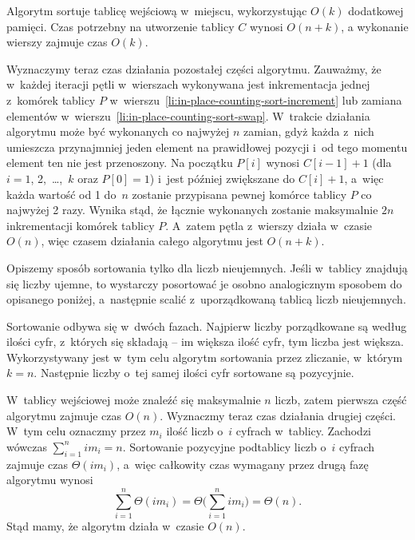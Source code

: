 Algorytm sortuje tablicę wejściową w~miejscu, wykorzystując $O(k)$ dodatkowej pamięci. Czas potrzebny na utworzenie tablicy $C$ wynosi $O(n+k)$, a wykonanie wierszy \twodashes{\ref{li:in-place-counting-sort-preprocessing-begin}}{\ref{li:in-place-counting-sort-preprocessing-end}} zajmuje czas $O(k)$.

Wyznaczymy teraz czas działania pozostałej części algorytmu. Zauważmy, że w~każdej iteracji pętli  w~wierszach \twodashes{\ref{li:in-place-counting-sort-while-begin}}{\ref{li:in-place-counting-sort-while-end}} wykonywana jest inkrementacja jednej z~komórek tablicy $P$ w~wierszu~\ref{li:in-place-counting-sort-increment} lub zamiana elementów w~wierszu~\ref{li:in-place-counting-sort-swap}. W~trakcie działania algorytmu może być wykonanych co najwyżej $n$ zamian, gdyż każda z~nich umieszcza przynajmniej jeden element na prawidłowej pozycji i~od tego momentu element ten nie jest przenoszony. Na początku $P[i]$ wynosi $C[i-1]+1$ (dla $i=1$, 2,~\dots,~$k$ oraz $P[0]=1$) i~jest później zwiększane do $C[i]+1$, a~więc każda wartość od 1 do~$n$ zostanie przypisana pewnej komórce tablicy $P$ co najwyżej 2 razy. Wynika stąd, że łącznie wykonanych zostanie maksymalnie $2n$ inkrementacji komórek tablicy $P$. A~zatem pętla  z~wierszy \twodashes{\ref{li:in-place-counting-sort-for-begin}}{\ref{li:in-place-counting-sort-for-end}} działa w~czasie $O(n)$, więc czasem działania całego algorytmu jest $O(n+k)$.


\subproblem %
Opiszemy sposób sortowania tylko dla liczb nieujemnych. Jeśli w~tablicy znajdują się liczby ujemne, to wystarczy posortować je osobno analogicznym sposobem do opisanego poniżej, a~następnie scalić z~uporządkowaną tablicą liczb nieujemnych.

Sortowanie odbywa się w~dwóch fazach. Najpierw liczby porządkowane są według ilości cyfr, z~których się składają -- im większa ilość cyfr, tym liczba jest większa. Wykorzystywany jest w~tym celu algorytm sortowania przez zliczanie, w~którym $k=n$. Następnie liczby o~tej samej ilości cyfr sortowane są pozycyjnie.

W~tablicy wejściowej może znaleźć się maksymalnie $n$ liczb, zatem pierwsza część algorytmu zajmuje czas $O(n)$. Wyznaczmy teraz czas działania drugiej części. W~tym celu oznaczmy przez $m_i$ ilość liczb o~$i$ cyfrach w~tablicy. Zachodzi wówczas $\sum_{i=1}^nim_i=n$. Sortowanie pozycyjne podtablicy liczb o~$i$ cyfrach zajmuje czas $\Theta(im_i)$, a~więc całkowity czas wymagany przez drugą fazę algorytmu wynosi
\[
    \sum_{i=1}^n\Theta(im_i) = \Theta\biggl(\sum_{i=1}^nim_i\biggr) = \Theta(n).
\]
Stąd mamy, że algorytm działa w~czasie $O(n)$.

